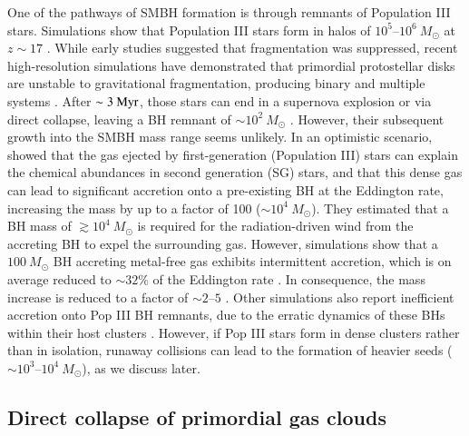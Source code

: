 One of the pathways of SMBH formation is through remnants of Population III stars. Simulations show that Population III stars form in halos of $10^5$--$10^6~M_{\odot}$ at $z \sim 17$ \citep{o2007population,o2008population}. While early studies suggested that fragmentation was suppressed, recent high-resolution simulations have demonstrated that primordial protostellar disks are unstable to gravitational fragmentation, producing binary and multiple systems \citep{clark2011formation}. After $\sim 3~{\rm Myr}$, those stars can end in a supernova explosion or via direct collapse, leaving a BH remnant of $\sim 10^2~M_{\odot}$ \citep{fryer2001pair}. However, their subsequent growth into the SMBH mass range seems unlikely. In an optimistic scenario, \citet{vesperini2010intermediate} showed that the gas ejected by first-generation (Population III) stars can explain the chemical abundances in second generation (SG) stars, and that this dense gas can lead to significant accretion onto a pre-existing BH at the Eddington rate, increasing the mass by up to a factor of 100 ($\sim 10^4~M_{\odot}$). They estimated that a BH mass of $\gtrsim 10^4 ~M_{\odot}$ is required for the radiation-driven wind from the accreting BH to expel the surrounding gas. However, simulations show that a $100~M_{\odot}$ BH accreting metal-free gas exhibits intermittent accretion, which is on average reduced to $\sim 32\%$ of the Eddington rate \citep{milosavljevic2009accretion}. In consequence, the mass increase is reduced to a factor of $\sim2$--$5$ \citep{vesperini2010intermediate}. Other simulations also report inefficient accretion onto Pop III BH remnants, due to the erratic dynamics of these BHs within their host clusters \citep{smith2018growth,pfister2019erratic}. However, if Pop III stars form in dense clusters rather than in isolation, runaway collisions can lead to the formation of heavier seeds ($\sim 10^3$--$10^4~M_{\odot}$), as we discuss later.

\subsection{Direct collapse of primordial gas clouds}

